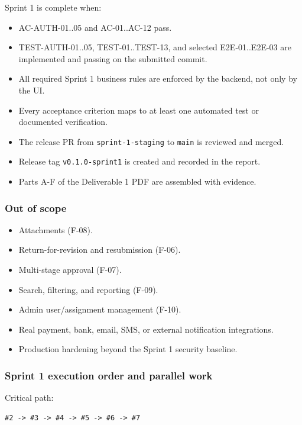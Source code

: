 \documentclass[11pt,a4paper]{article}
\begin{document}
Sprint 1 is complete when:\\

\begin{itemize}[leftmargin=*,itemsep=2pt,topsep=2pt]
  \item AC-AUTH-01..05 and AC-01..AC-12 pass.
  \item TEST-AUTH-01..05, TEST-01..TEST-13, and selected E2E-01..E2E-03 are implemented and passing on the submitted commit.
  \item All required Sprint 1 business rules are enforced by the backend, not only by the UI.
  \item Every acceptance criterion maps to at least one automated test or documented verification.
  \item The release PR from \texttt{sprint-1-staging} to \texttt{main} is reviewed and merged.
  \item Release tag \texttt{v0.1.0-sprint1} is created and recorded in the report.
  \item Parts A-F of the Deliverable 1 PDF are assembled with evidence.
\end{itemize}
\subsubsection{Out of scope}

\begin{itemize}[leftmargin=*,itemsep=2pt,topsep=2pt]
  \item Attachments (F-08).
  \item Return-for-revision and resubmission (F-06).
  \item Multi-stage approval (F-07).
  \item Search, filtering, and reporting (F-09).
  \item Admin user/assignment management (F-10).
  \item Real payment, bank, email, SMS, or external notification integrations.
  \item Production hardening beyond the Sprint 1 security baseline.
\end{itemize}
\subsubsection{Sprint 1 execution order and parallel work}

Critical path:\\

\begin{lstlisting}[basicstyle=\ttfamily\scriptsize]
#2 -> #3 -> #4 -> #5 -> #6 -> #7
\end{lstlisting}
\end{document}
